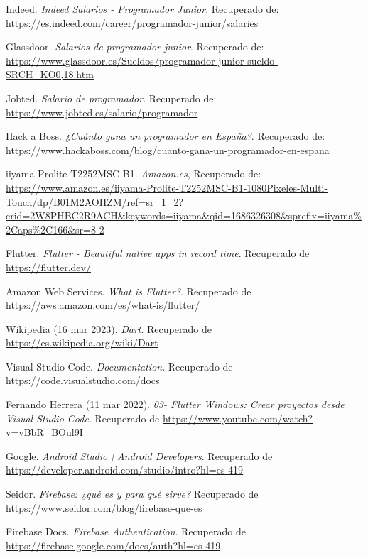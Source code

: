 \documentclass{article}
\begin{document}
\newpage
\renewcommand{\refname}{Bibliografía}

\begin{thebibliography}{0}

 Indeed. \textit{Indeed Salarios - Programador Junior}. Recuperado de: \url{https://es.indeed.com/career/programador-junior/salaries}

 Glassdoor. \textit{Salarios de programador junior}. Recuperado de: \url{https://www.glassdoor.es/Sueldos/programador-junior-sueldo-SRCH_KO0,18.htm}

 Jobted. \textit{Salario de programador}. Recuperado de: \url{https://www.jobted.es/salario/programador}

 Hack a Boss. \textit{¿Cuánto gana un programador en España?}. Recuperado de: \url{https://www.hackaboss.com/blog/cuanto-gana-un-programador-en-espana}

 iiyama Prolite T2252MSC-B1. \textit{Amazon.es}, Recuperado de: \url{https://www.amazon.es/iiyama-Prolite-T2252MSC-B1-1080Pixeles-Multi-Touch/dp/B01M2AOHZM/ref=sr_1_2?crid=2W8PHBC2R9ACH&keywords=iiyama&qid=1686326308&sprefix=iiyama%2Caps%2C166&sr=8-2}

 Flutter. \textit{Flutter - Beautiful native apps in record time}. Recuperado de \url{https://flutter.dev/}

 Amazon Web Services. \textit{What is Flutter?}. Recuperado de \url{https://aws.amazon.com/es/what-is/flutter/}

 Wikipedia (16 mar 2023). \textit{Dart}. Recuperado de \url{https://es.wikipedia.org/wiki/Dart}

 Visual Studio Code. \textit{Documentation}. Recuperado de \url{https://code.visualstudio.com/docs}

 Fernando Herrera (11 mar 2022). \textit{03- Flutter Windows: Crear proyectos desde Visual Studio Code}. Recuperado de \url{https://www.youtube.com/watch?v=vBbR_BOul9I}

 Google. \textit{Android Studio | Android Developers}. Recuperado de \url{https://developer.android.com/studio/intro?hl=es-419}

 Seidor. \textit{Firebase: ¿qué es y para qué sirve?} Recuperado de \url{https://www.seidor.com/blog/firebase-que-es}

 Firebase Docs. \textit{Firebase Authentication}. Recuperado de \url{https://firebase.google.com/docs/auth?hl=es-419}


\end{thebibliography}
\end{document}
